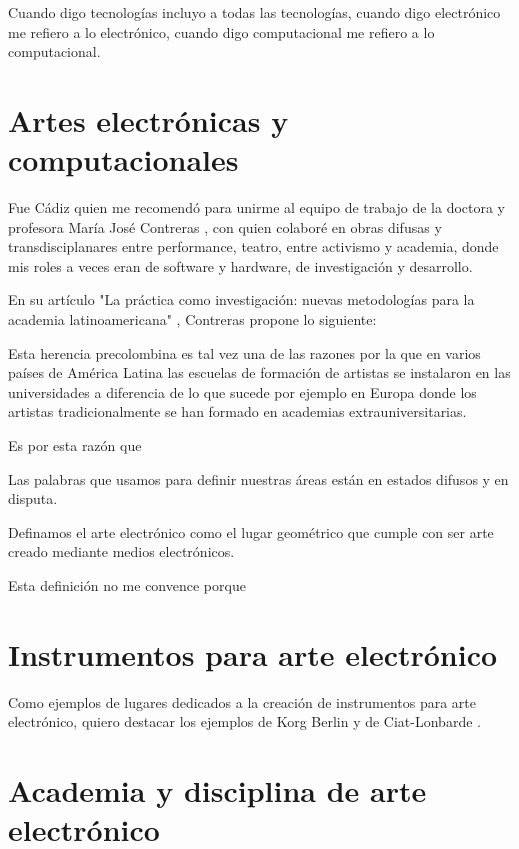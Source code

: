 \documentclass{article}
\begin{document}
Cuando digo tecnologías incluyo a todas las tecnologías, cuando digo electrónico me refiero a lo electrónico, cuando digo computacional me refiero a lo computacional.

\clearpage

\section{Artes electrónicas y computacionales}

Fue Cádiz quien me recomendó para unirme al equipo de trabajo de la doctora y profesora María José Contreras \cite{mariaJoseContreras}, con quien colaboré en obras difusas y transdisciplanares entre performance, teatro, entre activismo y academia, donde mis roles a veces eran de software y hardware, de investigación y desarrollo.

En su artículo "La práctica como investigación: nuevas metodologías para la academia latinoamericana" \cite{practicaComoInvestigacion}, Contreras propone lo siguiente:

\begin{displayquote}
    Esta herencia precolombina es tal vez una de las razones por la que en varios países de América Latina las escuelas de formación de artistas se instalaron en las universidades a diferencia de lo que sucede por ejemplo en Europa donde los artistas tradicionalmente se han formado en academias extrauniversitarias.
\end{displayquote}

Es por esta razón que 

Las palabras que usamos para definir nuestras áreas están en estados difusos y en disputa.

Definamos el arte electrónico como el lugar geométrico que cumple con ser arte creado mediante medios electrónicos.

Esta definición no me convence porque 

\clearpage

\section{Instrumentos para arte electrónico}

Como ejemplos de lugares dedicados a la creación de instrumentos para arte electrónico, quiero destacar los ejemplos de Korg Berlin \cite{korgBerlin} y de Ciat-Lonbarde \cite{ciatLonbarde}.

\clearpage

\section{Academia y disciplina de arte electrónico}
\end{document}
